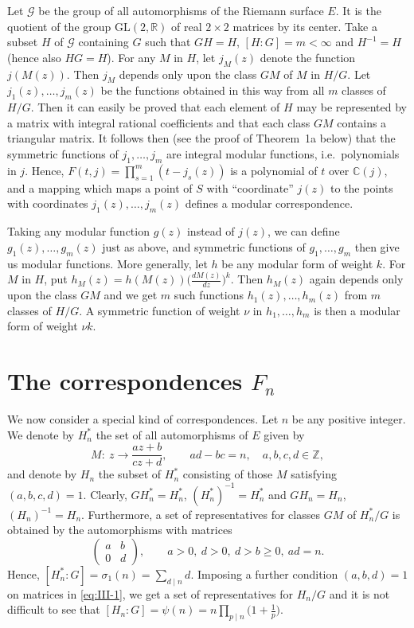 Let $\mathcal{G}$ be the group of all automorphisms of the Riemann surface
$E$. It is the quotient of the group $\mathrm{GL}(2,\mathbb{R})$ of real
$2\times 2$ matrices by its center. Take a subset $H$ of $\mathcal{G}$
containing $G$ such that $GH=H$, $[H:G]=m<\infty$ and $H^{-1}=H$ (hence
also $HG=H$). For any $M$ in $H$, let $j_{M}(z)$ denote the function
$j(M(z))$. Then $j_{M}$ depends only upon the class $GM$ of $M$ in $H/G$.
Let $j_{1}(z),\ldots,j_{m}(z)$ be the functions obtained in this way from
all $m$ classes of $H/G$. Then it can easily be proved that each element
of $H$ may be represented by a matrix with integral rational coefficients
and that each class $GM$ contains a triangular matrix. It follows then
(see the proof of Theorem~1a below) that the symmetric functions of
$j_{1},\ldots,j_{m}$ are integral modular functions, i.e.\ polynomials in
$j$. Hence, $F(t,j)=\prod_{s=1}^{m}(t-j_{s}(z))$ is a polynomial of $t$
over $\mathbb{C}(j)$, and a mapping which maps a point of $S$ with
``coordinate'' $j(z)$ to the points with coordinates
$j_{1}(z),\ldots,j_{m}(z)$ defines a modular correspondence.

Taking any modular function $g(z)$ instead of $j(z)$, we can define
$g_{1}(z),\ldots,g_{m}(z)$ just as above, and symmetric functions of
$g_{1},\ldots,g_{m}$ then give us modular functions. More generally, let
$h$ be any modular form of weight $k$. For $M$ in $H$, put
$h_{M}(z)=h(M(z))\bigl(\frac{dM(z)}{dz}\bigr)^{k}$. Then $h_{M}(z)$ again
depends only upon the class $GM$ and we get $m$ such functions
$h_{1}(z),\ldots,h_{m}(z)$ from $m$ classes of $H/G$. A symmetric function
of weight $\nu$ in $h_{1},\ldots,h_{m}$ is then a modular form of weight
$\nu k$.

\section{\texorpdfstring{The correspondences $F_{n}$}{The correspondences Fn}}\label{sec:III-Fn}

We now consider a special kind of correspondences. Let $n$ be any positive
integer. We denote by $H_{n}^{*}$ the set of all automorphisms of $E$
given by
\[
M:\ z\longrightarrow\frac{az+b}{cz+d},\qquad
ad-bc=n,\quad a,b,c,d\in\mathbb{Z},
\]
and denote by $H_{n}$ the subset of $H_{n}^{*}$ consisting of those $M$
satisfying $(a,b,c,d)=1$. Clearly, $GH_{n}^{*}=H_{n}^{*}$,
$(H_{n}^{*})^{-1}=H_{n}^{*}$ and $GH_{n}=H_{n}$, $(H_{n})^{-1}=H_{n}$.
Furthermore, a set of representatives for classes $GM$ of $H_{n}^{*}/G$ is
obtained by the automorphisms with matrices
\[
\begin{pmatrix}a&b\\ 0&d\end{pmatrix},\qquad
a>0,\ d>0,\ d>b\geq 0,\ ad=n.
\tag{1}\label{eq:III-1}
\]
Hence, $[H_{n}^{*}:G]=\sigma_{1}(n)=\sum_{d\mid n}d$. Imposing a further
condition $(a,b,d)=1$ on matrices in \eqref{eq:III-1}, we get a set of
representatives for $H_{n}/G$ and it is not difficult to see that
$[H_{n}:G]=\psi(n)=n\prod_{p\mid n}\bigl(1+\frac{1}{p}\bigr)$.

